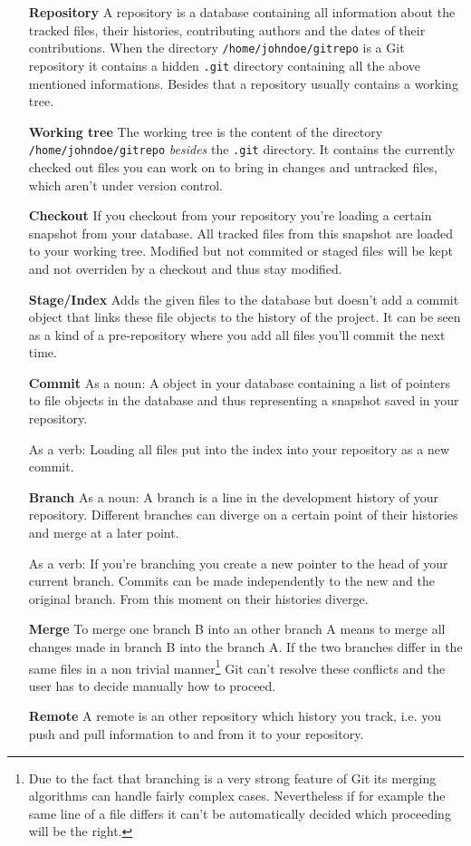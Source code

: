 \documentclass[a4paper,10pt]{scrartcl}
\begin{document}
\begin{itemize}
  \item[\textbf{Repository}] A repository is a database containing all information about the tracked files, their histories, contributing authors and the dates of their contributions. When the directory \texttt{/home/johndoe/gitrepo} is a Git repository it contains a hidden \texttt{.git} directory containing all the above mentioned informations. Besides that a repository usually contains a working tree.
  \item[\textbf{Working tree}] The working tree is the content of the directory \texttt{/home/johndoe/gitrepo} \textit{besides} the \texttt{.git} directory. It contains the currently checked out files you can work on to bring in changes and untracked files, which aren't under version control.
  \item[\textbf{Checkout}] If you checkout from your repository you're loading a certain snapshot from your database. All tracked files from this snapshot are loaded to your working tree. Modified but not commited or staged files will be kept and not overriden by a checkout and thus stay modified.
  \item[\textbf{Stage/Index}] Adds the given files to the database but doesn't add a commit object that links these file objects to the history of the project. It can be seen as a kind of a pre-repository where you add all files you'll commit the next time. 
  \item[\textbf{Commit}] As a noun: A object in your database containing a list of pointers to file objects in the database and thus representing a snapshot saved in your repository.\smallskip

    As a verb: Loading all files put into the index into your repository as a new commit.
  \item[\textbf{Branch}] As a noun: A branch is a line in the development history of your repository. Different branches can diverge on a certain point of their histories and merge at a later point.\smallskip

    As a verb: If you're branching you create a new pointer to the head of your current branch. Commits can be made independently to the new and the original branch. From this moment on their histories diverge.
  \item[\textbf{Merge}] To merge one branch B into an other branch A means to merge all changes made in branch B into the branch A. If the two branches differ in the same files in a non trivial manner\footnote{Due to the fact that branching is a very strong feature of Git its merging algorithms can handle fairly complex cases. Nevertheless if for example the same line of a file differs it can't be automatically decided which proceeding will be the right.} Git can't resolve these conflicts and the user has to decide manually how to proceed.
  \item[\textbf{Remote}] A remote is an other repository which history you track, i.e. you push and pull information to and from it to your repository.


\end{itemize}
\end{document}
